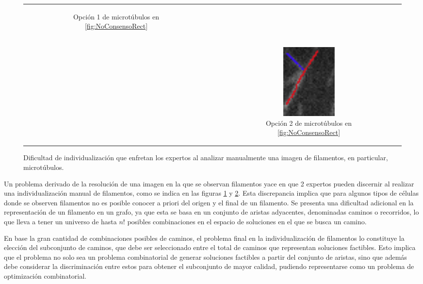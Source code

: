 \begin{figure}[h]
\begin{tabular}{c c c}
\begin{subfigure}[t]{0.21\textwidth}
        \caption{Opci\'on 1 de microt\'ubulos en \ref{fig:NoConsensoRect}}
        \label{fig:NoConsensoOpcion1}
        \end{subfigure} \\
        & &
        \begin{subfigure}[b]{0.21\textwidth}
        \includegraphics[scale=0.8]{imagenes/NoConsenso4.png}
        \caption{Opci\'on 2 de microt\'ubulos en \ref{fig:NoConsensoRect}}
        \label{fig:NoConsensoOpcion2}
        \end{subfigure} \\
    \end{tabular}
    
    \caption{Dificultad de individualizaci\'on que enfretan los expertos al analizar manualmente una imagen de filamentos, en particular, microt\'ubulos.}
    \label{fig:NoConsenso}
\end{figure}

Un problema derivado de la resoluci\'on de una imagen en la que se observan filamentos yace en que 2 expertos pueden discernir al realizar una individualizaci\'on manual de filamentos, como se indica en las figuras \ref{fig:NoConsensoOpcion1} y \ref{fig:NoConsensoOpcion2}. Esta discrepancia implica que para algunos tipos de c\'elulas donde se observen filamentos no es posible conocer a priori del origen y el final de un filamento. Se presenta una dificultad adicional en la representaci\'on de un filamento en un grafo, ya que esta se basa en un conjunto de aristas adyacentes, denominadas caminos o recorridos, lo que lleva a tener un universo de hasta $n!$ posibles combinaciones en el espacio de soluciones en el que se busca un camino.


En base la gran cantidad de combinaciones posibles de caminos, el problema final en la individualizaci\'on de filamentos lo constituye la elecci\'on del subconjunto de caminos, que debe ser seleccionado entre el total de caminos que representan soluciones factibles. Esto implica que el problema no solo sea un problema combinatorial de generar soluciones factibles a partir del conjunto de aristas, sino que adem\'as debe considerar la discriminaci\'on entre estos para obtener el subconjunto de mayor calidad, pudiendo representarse como un problema de optimizaci\'on combinatorial.

